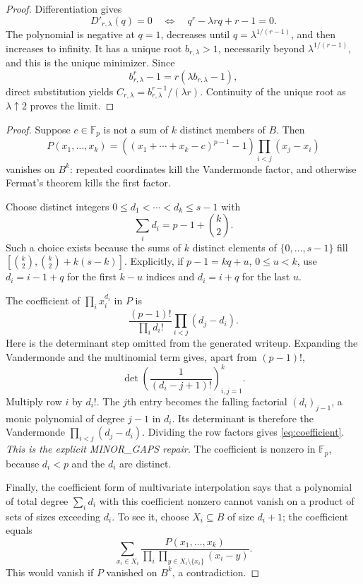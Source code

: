 \documentclass[11pt,a4paper]{article}
\theoremstyle{plain}
\theoremstyle{definition}
\theoremstyle{remark}
\newcommand{\F}{\mathbb F}
\begin{document}
\label{pf:constant}
\lemconstant*
\begin{proof}
Differentiation gives
\[
 D'_{r,\lambda}(q)=0
 \quad\Longleftrightarrow\quad q^r-\lambda rq+r-1=0.
\]
The polynomial is negative at $q=1$, decreases until
$q=\lambda^{1/(r-1)}$, and then increases to infinity. It has a unique
root $b_{r,\lambda}>1$, necessarily beyond
$\lambda^{1/(r-1)}$, and this is the unique minimizer. Since
\[
 b_{r,\lambda}^r-1
 =r(\lambda b_{r,\lambda}-1),
\]
direct substitution yields
$C_{r,\lambda}=b_{r,\lambda}^{r-1}/(\lambda r)$.
Continuity of the unique root as $\lambda\uparrow2$ proves the limit.
\end{proof}

\label{pf:restricted}
\lemrestricted*
\begin{proof}
Suppose $c\in\F_p$ is not a sum of $k$ distinct members of $B$. Then
\[
 P(x_1,\ldots,x_k)=
 \left((x_1+\cdots+x_k-c)^{p-1}-1\right)
 \prod_{i<j}(x_j-x_i)
\]
vanishes on $B^k$: repeated coordinates kill the Vandermonde factor,
and otherwise Fermat's theorem kills the first factor.

Choose distinct integers $0\le d_1<\cdots<d_k\le s-1$ with
\[
 \sum_i d_i=p-1+\binom{k}{2}.
\]
Such a choice exists because the sums of $k$ distinct elements of
$\{0,\ldots,s-1\}$ fill
$[\binom{k}{2},\binom{k}{2}+k(s-k)]$. Explicitly, if
$p-1=kq+u$, $0\le u<k$, use $d_i=i-1+q$ for the first $k-u$ indices
and $d_i=i+q$ for the last $u$.

The coefficient of $\prod_i x_i^{d_i}$ in $P$ is
\begin{equation}\label{eq:coefficient}
 \frac{(p-1)!}{\prod_i d_i!}\prod_{i<j}(d_j-d_i).
\end{equation}
Here is the determinant step omitted from the generated writeup. Expanding
the Vandermonde and the multinomial term gives, apart from $(p-1)!$,
\[
 \det\left(\frac1{(d_i-j+1)!}\right)_{i,j=1}^k.
\]
Multiply row $i$ by $d_i!$. The $j$th entry becomes the falling
factorial $(d_i)_{j-1}$, a monic polynomial of degree $j-1$ in $d_i$.
Its determinant is therefore the Vandermonde
$\prod_{i<j}(d_j-d_i)$. Dividing the row factors gives
\eqref{eq:coefficient}. \emph{This is the explicit MINOR\_GAPS repair.}
The coefficient is nonzero in $\F_p$, because $d_i<p$ and the $d_i$ are
distinct.

Finally, the coefficient form of multivariate interpolation says that a
polynomial of total degree $\sum_i d_i$ with this coefficient nonzero
cannot vanish on a product of sets of sizes exceeding $d_i$. To see it,
choose $X_i\subseteq B$ of size $d_i+1$; the coefficient equals
\[
 \sum_{x_i\in X_i}
 \frac{P(x_1,\ldots,x_k)}
 {\prod_i\prod_{y\in X_i\setminus\{x_i\}}(x_i-y)}.
\]
This would vanish if $P$ vanished on $B^k$, a contradiction.
\end{proof}
\end{document}
